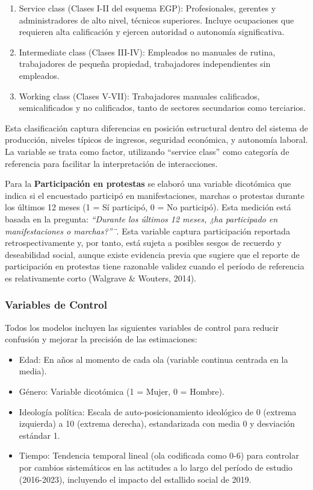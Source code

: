 \documentclass[
  13pt,
]{article}
\begin{document}
\begin{enumerate}
\def\labelenumi{\arabic{enumi}.}
\item
  Service class (Clases I-II del esquema EGP): Profesionales, gerentes y
  administradores de alto nivel, técnicos superiores. Incluye
  ocupaciones que requieren alta calificación y ejercen autoridad o
  autonomía significativa.
\item
  Intermediate class (Clases III-IV): Empleados no manuales de rutina,
  trabajadores de pequeña propiedad, trabajadores independientes sin
  empleados.
\item
  Working class (Clases V-VII): Trabajadores manuales calificados,
  semicalificados y no calificados, tanto de sectores secundarios como
  terciarios.
\end{enumerate}

Esta clasificación captura diferencias en posición estructural dentro
del sistema de producción, niveles típicos de ingresos, seguridad
económica, y autonomía laboral. La variable se trata como factor,
utilizando ``service class'' como categoría de referencia para facilitar
la interpretación de interacciones.

Para la \textbf{Participación en protestas} se elaboró una variable
dicotómica que indica si el encuestado participó en manifestaciones,
marchas o protestas durante los últimos 12 meses (1 = Sí participó, 0 =
No participó). Esta medición está basada en la pregunta: \emph{``Durante
los últimos 12 meses, ¿ha participado en manifestaciones o marchas?''¨}.
Esta variable captura participación reportada retrospectivamente y, por
tanto, está sujeta a posibles sesgos de recuerdo y deseabilidad social,
aunque existe evidencia previa que sugiere que el reporte de
participación en protestas tiene razonable validez cuando el período de
referencia es relativamente corto (Walgrave \& Wouters, 2014).

\subsubsection{Variables de Control}\label{variables-de-control}

Todos los modelos incluyen las siguientes variables de control para
reducir confusión y mejorar la precisión de las estimaciones:

\begin{itemize}
\item
  Edad: En años al momento de cada ola (variable continua centrada en la
  media).
\item
  Género: Variable dicotómica (1 = Mujer, 0 = Hombre).
\item
  Ideología política: Escala de auto-posicionamiento ideológico de 0
  (extrema izquierda) a 10 (extrema derecha), estandarizada con media 0
  y desviación estándar 1.
\item
  Tiempo: Tendencia temporal lineal (ola codificada como 0-6) para
  controlar por cambios sistemáticos en las actitudes a lo largo del
  período de estudio (2016-2023), incluyendo el impacto del estallido
  social de 2019.
\end{itemize}
\end{document}
